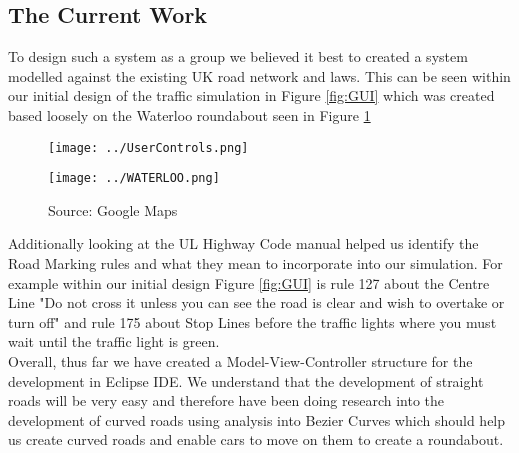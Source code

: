 \documentclass[a4paper,11pt]{article}
\begin{document}
\subsection{The Current Work}%
To design such a system as a group we believed it best to created a system modelled against the existing UK road network and laws. This can be seen within our initial design of the traffic simulation in Figure \ref{fig:GUI} which was created based loosely on the Waterloo roundabout seen in Figure \ref{fig:Waterloo}

\begin{figure}[ht]%
\centering
\begin{minipage}[b]{0.45\linewidth}
		\texttt{[image: ../UserControls.png]} 
	\caption*{ }
	\label{fig:GUI}
\end{minipage}
\begin{minipage}[b]{0.45\linewidth}
	\texttt{[image: ../WATERLOO.png]} 	
	\caption*{Source: Google Maps}
	\label{fig:Waterloo}
\end{minipage}

\end{figure}

Additionally looking at the UL Highway Code manual helped us identify the Road Marking rules and what they mean to  incorporate into our simulation. For example within our initial design Figure \ref{fig:GUI} is rule 127 about the Centre Line "Do not cross it unless you can see the road is clear and wish to overtake or turn off" and rule 175 about Stop Lines before the traffic lights where you must wait until the traffic light is green.\\Overall, thus far we have created a Model-View-Controller structure for the development in Eclipse IDE. We understand that the development of straight roads will be very easy and therefore have been doing research into the development of curved roads using analysis into Bezier Curves which should help us create curved roads and enable cars to move on them to create a roundabout.   
\end{document}
